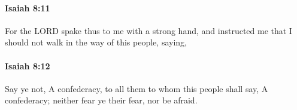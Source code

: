 		\paragraph{Isaiah 8:11} %
			\label{ISAIAH-8-11}

			For the LORD spake thus to me with a strong hand, and instructed me that I should not walk in the way of this people, saying,


		\paragraph{Isaiah 8:12} %
			\label{ISAIAH-8-12}

			Say ye not, A confederacy, to all them to whom this people shall say, A confederacy; neither fear ye their fear, nor be afraid.


